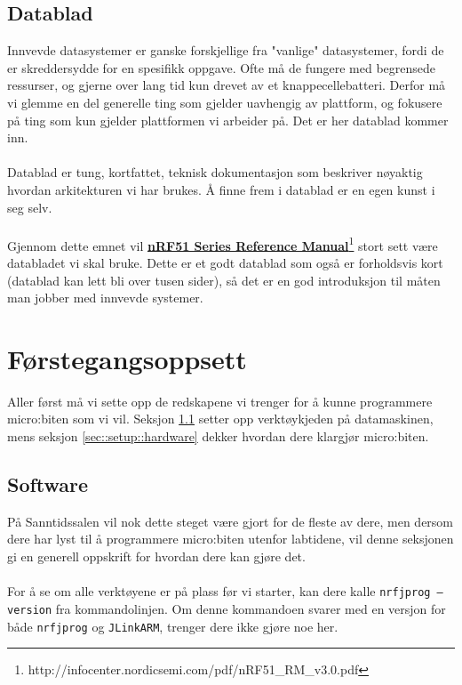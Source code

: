 \documentclass[11pt,a4paper]{article}
\begin{document}
\subsection{Datablad}
Innvevde datasystemer er ganske forskjellige fra "vanlige" datasystemer, fordi de er skreddersydde for en spesifikk oppgave. Ofte må de fungere med begrensede ressurser, og gjerne over lang tid kun drevet av et knappecellebatteri. Derfor må vi glemme en del generelle ting som gjelder uavhengig av plattform, og fokusere på ting som kun gjelder plattformen vi arbeider på. Det er her datablad kommer inn.\\
\\
Datablad er tung, kortfattet, teknisk dokumentasjon som beskriver nøyaktig hvordan arkitekturen vi har brukes. Å finne frem i datablad er en egen kunst i seg selv.\\
\\
Gjennom dette emnet vil \href{http://infocenter.nordicsemi.com/pdf/nRF51\_RM\_v3.0.pdf}{\textbf{nRF51 Series Reference Manual}}\footnote{http://infocenter.nordicsemi.com/pdf/nRF51\_RM\_v3.0.pdf} stort sett være databladet vi skal bruke. Dette er et godt datablad som også er forholdsvis kort (datablad kan lett bli over tusen sider), så det er en god introduksjon til måten man jobber med innvevde systemer.

\section{Førstegangsoppsett}
Aller først må vi sette opp de redskapene vi trenger for å kunne programmere micro:biten som vi vil. Seksjon \ref{sec::setup::software} setter opp verktøykjeden på datamaskinen, mens seksjon \ref{sec::setup::hardware} dekker hvordan dere klargjør micro:biten.

\subsection{Software}
\label{sec::setup::software}
På Sanntidssalen vil nok dette steget være gjort for de fleste av dere, men dersom dere har lyst til å programmere micro:biten utenfor labtidene, vil denne seksjonen gi en generell oppskrift for hvordan dere kan gjøre det.\\
\\
For å se om alle verktøyene er på plass før vi starter, kan dere kalle \texttt{nrfjprog --version} fra kommandolinjen. Om denne kommandoen svarer med en versjon for både \texttt{nrfjprog} og \texttt{JLinkARM}, trenger dere ikke gjøre noe her.
\end{document}

